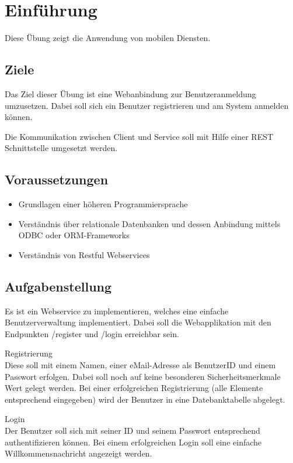 
\section{Einführung}
Diese Übung zeigt die Anwendung von mobilen Diensten.

\subsection{Ziele}
Das Ziel dieser Übung ist eine Webanbindung zur Benutzeranmeldung umzusetzen. Dabei soll sich ein Benutzer registrieren und am System anmelden können.

Die Kommunikation zwischen Client und Service soll mit Hilfe einer REST Schnittstelle umgesetzt werden.

\subsection{Voraussetzungen}

\begin{itemize}
	\item Grundlagen einer höheren Programmiersprache
	\item Verständnis über relationale Datenbanken und dessen Anbindung mittels ODBC oder ORM-Frameworks
	\item Verständnis von Restful Webservices
\end{itemize}

\subsection{Aufgabenstellung}

Es ist ein Webservice zu implementieren, welches eine einfache Benutzerverwaltung implementiert. Dabei soll die Webapplikation mit den Endpunkten /register und /login erreichbar sein.

Registrierung \\
Diese soll mit einem Namen, einer eMail-Adresse als BenutzerID und einem Passwort erfolgen. Dabei soll noch auf keine besonderen Sicherheitsmerkmale Wert gelegt werden. Bei einer erfolgreichen Registrierung (alle Elemente entsprechend eingegeben) wird der Benutzer in eine Datebanktabelle abgelegt.

Login \\
Der Benutzer soll sich mit seiner ID und seinem Passwort entsprechend authentifizieren können. Bei einem erfolgreichen Login soll eine einfache Willkommensnachricht angezeigt werden.

